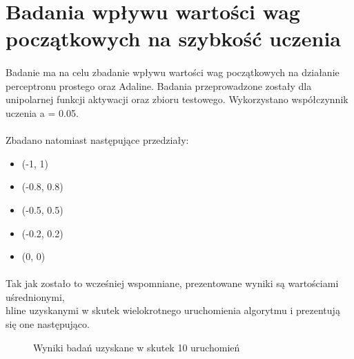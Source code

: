 \documentclass[../main.tex]{subfiles}
\begin{document}
    \section{Badania wpływu wartości wag początkowych na szybkość uczenia}
    \paragraph{}
    Badanie ma na celu zbadanie wpływu wartości wag początkowych na działanie perceptronu prostego oraz Adaline. Badania przeprowadzone zostały dla unipolarnej funkcji aktywacji oraz zbioru testowego. Wykorzystano współczynnik uczenia a = 0.05.
    
    \paragraph{}
    Zbadano natomiast następujące przedziały:
    \begin{itemize}
     \item (-1, 1)
     \item (-0.8,  0.8)
     \item (-0.5, 0.5)
     \item (-0.2, 0.2)
     \item (0, 0)
    \end{itemize}
    
    \paragraph{}
    Tak jak zostało to wcześniej wspomniane, prezentowane wyniki są wartościami uśrednionymi, \\hline
    uzyskanymi w skutek wielokrotnego uruchomienia algorytmu i prezentują się one następująco.
    \newline 
    \begin{figure}[H]
    \centering
    \caption{Wyniki badań uzyskane w skutek 10 uruchomień}
    \end{figure}
\end{document}
